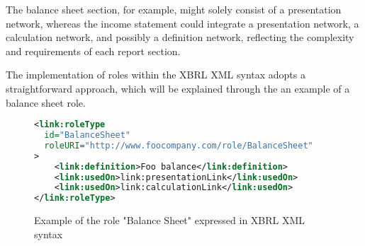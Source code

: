 The balance sheet section, for example, might solely consist of a presentation network, whereas the income statement could integrate a presentation network, 
a calculation network, and possibly a definition network, reflecting the complexity and requirements of each report section.

The implementation of roles within the XBRL XML syntax adopts a straightforward approach, 
which will be explained through the an example of a balance sheet role.

\begin{figure}[H]
    \caption{Example of the role "Balance Sheet" expressed in XBRL XML syntax}
    \label{fig:example_role_xbrl}
    \begin{lstlisting}[language=XML,basicstyle=\small\ttfamily]
<link:roleType 
  id="BalanceSheet" 
  roleURI="http://www.foocompany.com/role/BalanceSheet"
>
    <link:definition>Foo balance</link:definition>
    <link:usedOn>link:presentationLink</link:usedOn>
    <link:usedOn>link:calculationLink</link:usedOn>
</link:roleType>
\end{lstlisting}
\end{figure}





